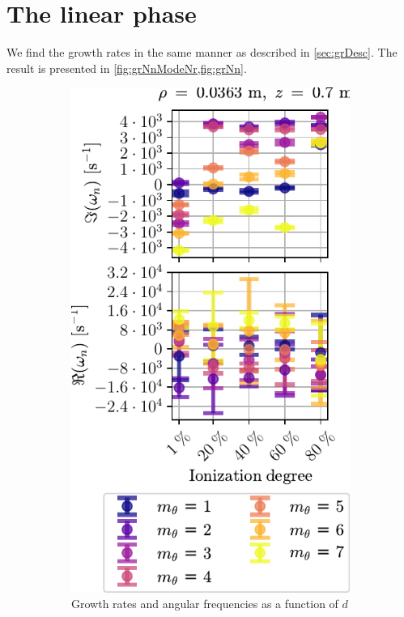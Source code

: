 \section{The linear phase}
%
We find the growth rates in the same manner as described in \cref{sec:grDesc}.
The result is presented in \cref{fig:grNnModeNr,fig:grNn}.
%
\begin{figure}[htbp]
    \centering
    \begin{subfigure}[h]{0.45\textwidth}
       \centering
       \includegraphics{fig/results/neutral/growthRatesNnModes}
       \caption{Growth rates and angular frequencies as a function of $d$}
       \label{fig:grNnModeNr}
    \end{subfigure}
    \hfill
    \begin{subfigure}[h]{0.45\textwidth}

\end{subfigure}
\end{figure}
